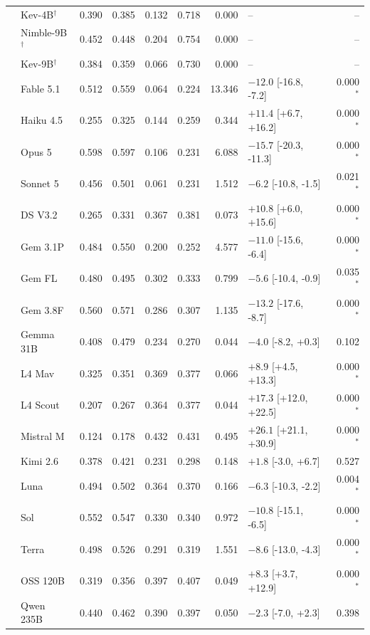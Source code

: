 \begin{longtable}{llrrrrrlr}
 & Kev-4B$^{\dagger}$ & 0.390 & 0.385 & 0.132 & 0.718 & 0.000 & -- & -- \\
 & Nimble-9B$^{\dagger}$ & 0.452 & 0.448 & 0.204 & 0.754 & 0.000 & -- & -- \\
 & Kev-9B$^{\dagger}$ & 0.384 & 0.359 & 0.066 & 0.730 & 0.000 & -- & -- \\
 & Fable 5.1 & 0.512 & 0.559 & 0.064 & 0.224 & 13.346 & $-12.0$ [-16.8, -7.2] & 0.000$^{*}$ \\
 & Haiku 4.5 & 0.255 & 0.325 & 0.144 & 0.259 & 0.344 & $+11.4$ [+6.7, +16.2] & 0.000$^{*}$ \\
 & Opus 5 & 0.598 & 0.597 & 0.106 & 0.231 & 6.088 & $-15.7$ [-20.3, -11.3] & 0.000$^{*}$ \\
 & Sonnet 5 & 0.456 & 0.501 & 0.061 & 0.231 & 1.512 & $-6.2$ [-10.8, -1.5] & 0.021$^{*}$ \\
 & DS V3.2 & 0.265 & 0.331 & 0.367 & 0.381 & 0.073 & $+10.8$ [+6.0, +15.6] & 0.000$^{*}$ \\
 & Gem 3.1P & 0.484 & 0.550 & 0.200 & 0.252 & 4.577 & $-11.0$ [-15.6, -6.4] & 0.000$^{*}$ \\
 & Gem FL & 0.480 & 0.495 & 0.302 & 0.333 & 0.799 & $-5.6$ [-10.4, -0.9] & 0.035$^{*}$ \\
 & Gem 3.8F & 0.560 & 0.571 & 0.286 & 0.307 & 1.135 & $-13.2$ [-17.6, -8.7] & 0.000$^{*}$ \\
 & Gemma 31B & 0.408 & 0.479 & 0.234 & 0.270 & 0.044 & $-4.0$ [-8.2, +0.3] & 0.102 \\
 & L4 Mav & 0.325 & 0.351 & 0.369 & 0.377 & 0.066 & $+8.9$ [+4.5, +13.3] & 0.000$^{*}$ \\
 & L4 Scout & 0.207 & 0.267 & 0.364 & 0.377 & 0.044 & $+17.3$ [+12.0, +22.5] & 0.000$^{*}$ \\
 & Mistral M & 0.124 & 0.178 & 0.432 & 0.431 & 0.495 & $+26.1$ [+21.1, +30.9] & 0.000$^{*}$ \\
 & Kimi 2.6 & 0.378 & 0.421 & 0.231 & 0.298 & 0.148 & $+1.8$ [-3.0, +6.7] & 0.527 \\
 & Luna & 0.494 & 0.502 & 0.364 & 0.370 & 0.166 & $-6.3$ [-10.3, -2.2] & 0.004$^{*}$ \\
 & Sol & 0.552 & 0.547 & 0.330 & 0.340 & 0.972 & $-10.8$ [-15.1, -6.5] & 0.000$^{*}$ \\
 & Terra & 0.498 & 0.526 & 0.291 & 0.319 & 1.551 & $-8.6$ [-13.0, -4.3] & 0.000$^{*}$ \\
 & OSS 120B & 0.319 & 0.356 & 0.397 & 0.407 & 0.049 & $+8.3$ [+3.7, +12.9] & 0.000$^{*}$ \\
 & Qwen 235B & 0.440 & 0.462 & 0.390 & 0.397 & 0.050 & $-2.3$ [-7.0, +2.3] & 0.398 \\

\end{longtable}
